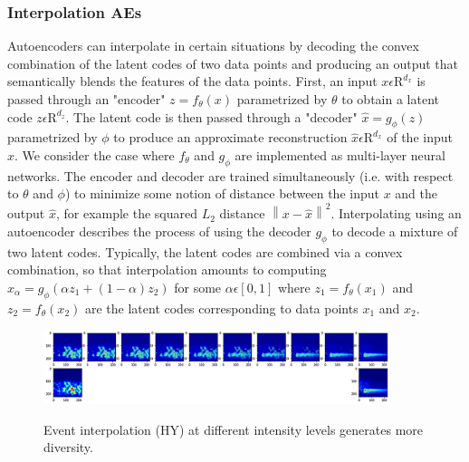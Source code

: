 \documentclass[journal]{IEEEtran}
\begin{document}
\subsubsection{Interpolation AEs}
Autoencoders can interpolate in certain situations by decoding the convex combination of the latent codes of two data points and producing an output that semantically blends the features of the data points\cite{berthelot2018understanding}.
First, an input $x\epsilon\mathrm{R}^{d_x}$ is passed through an "encoder" $z=f_\theta(x)$ parametrized by $\theta$ to obtain a latent code $z\epsilon\mathrm{R}^{d_z}$. The latent code is then passed through a "decoder" $\hat{x}=g_\phi(z)$ parametrized by $\phi$ to produce an approximate reconstruction $\hat{x}\epsilon\mathrm{R}^{d_x}$ of the input $x$. We consider the case where $f_\theta$ and $g_\phi$ are implemented as multi-layer neural networks. The encoder and decoder are trained simultaneously (i.e. with respect to $\theta$ and $\phi$) to minimize some notion of distance between the input $x$ and the output $\hat{x}$, for example the squared $L_2$ distance $\left\|x-\hat{x}\right\|^2$.
Interpolating using an autoencoder describes the process of using the decoder $g_\phi$ to decode a mixture of two latent codes. Typically, the latent codes are combined via a convex combination, so that interpolation amounts to computing $x_\alpha=g_\phi(\alpha z_1+(1-\alpha) z_2)$ for some $\alpha\epsilon[0,1]$ where $z_1=f_\theta(x_1)$ and $z_2=f_\theta(x_2)$ are the latent codes corresponding to data points $x_1$ and $x_2$.
\begin{figure}
\centering
{\includegraphics[width=0.9\textwidth,keepaspectratio]{img/da_interpolacion.png}}
\caption{Event interpolation (HY) at different intensity levels generates more diversity.}
\label{fig:da_interpolation}
\end{figure}
\end{document}
